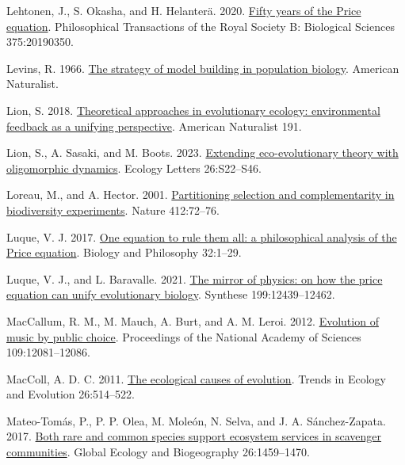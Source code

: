 \documentclass[
]{article}
\newlength{\cslhangindent}
\newenvironment{CSLReferences}[2] %
 {\begin{list}{}{%
  \setlength{\itemindent}{0pt}
  \setlength{\leftmargin}{0pt}
  \setlength{\parsep}{0pt}
  \ifodd #1
   \setlength{\leftmargin}{\cslhangindent}
   \setlength{\itemindent}{-1\cslhangindent}
  \fi
  \setlength{\itemsep}{#2\baselineskip}}}
 {\end{list}}
\begin{document}
\begin{CSLReferences}{0}{0}
Lehtonen, J., S. Okasha, and H. Helanterä. 2020.
\href{https://doi.org/10.1098/rstb.2019.0350}{{Fifty years of the Price
equation}}. Philosophical Transactions of the Royal Society B:
Biological Sciences 375:20190350.

Levins, R. 1966. \href{https://doi.org/10.2307/27836590}{The strategy of
model building in population biology}. American Naturalist.

Lion, S. 2018. \href{https://doi.org/10.1086/694865}{{Theoretical
approaches in evolutionary ecology: environmental feedback as a unifying
perspective}}. American Naturalist 191.

Lion, S., A. Sasaki, and M. Boots. 2023.
\href{https://doi.org/10.1111/ele.14183}{Extending eco-evolutionary
theory with oligomorphic dynamics}. Ecology Letters 26:S22--S46.

Loreau, M., and A. Hector. 2001.
\href{https://doi.org/10.1038/35083573}{{Partitioning selection and
complementarity in biodiversity experiments}}. Nature 412:72--76.

Luque, V. J. 2017. \href{https://doi.org/10.1007/s10539-016-9538-y}{{One
equation to rule them all: a philosophical analysis of the Price
equation}}. Biology and Philosophy 32:1--29.

Luque, V. J., and L. Baravalle. 2021.
\href{https://doi.org/10.1007/s11229-021-03339-6}{{The mirror of
physics: on how the price equation can unify evolutionary biology}}.
Synthese 199:12439--12462.

MacCallum, R. M., M. Mauch, A. Burt, and A. M. Leroi. 2012.
\href{https://doi.org/10.5061/dryad.h0228}{{Evolution of music by public
choice}}. Proceedings of the National Academy of Sciences
109:12081--12086.

MacColl, A. D. C. 2011.
\href{https://doi.org/10.1016/j.tree.2011.06.009}{{The ecological causes
of evolution}}. Trends in Ecology and Evolution 26:514--522.

Mateo-Tomás, P., P. P. Olea, M. Moleón, N. Selva, and J. A.
Sánchez-Zapata. 2017. \href{https://doi.org/10.1111/geb.12673}{{Both
rare and common species support ecosystem services in scavenger
communities}}. Global Ecology and Biogeography 26:1459--1470.


\end{CSLReferences}
\end{document}
